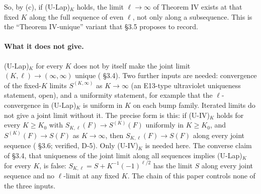 So, by (c), if (U-Lap)$_K$ holds, the limit $\ell\to\infty$ of Theorem IV exists at that fixed $K$ along the full sequence of even $\ell$, not only along a subsequence. This is the ``Theorem IV-unique'' variant that  \S3.5 proposes to record.

\paragraph{What it does not give.} (U-Lap)$_K$ for every $K$ does not by itself make the joint limit $(K,\ell)\to(\infty,\infty)$ unique ( \S3.4). Two further inputs are needed: convergence of the fixed-$K$ limits $S^{(K,\infty)}$ as $K\to\infty$ (an E13-type ultraviolet uniqueness statement, open), and a uniformity statement, for example that the $\ell$-convergence in (U-Lap)$_K$ is uniform in $K$ on each bump family. Iterated limits do not give a joint limit without it. The precise form is this: if (U-IV)$_K$ holds for every $K\ge K_0$ with $S_{K,\ell}(F)\to S^{(K)}(F)$ uniformly in $K\ge K_0$, and $S^{(K)}(F)\to S(F)$ as $K\to\infty$, then $S_{K,\ell}(F)\to S(F)$ along every joint sequence ( \S3.6; verified,  D-5). Only (U-IV)$_K$ is needed here. The converse claim of  \S3.4, that uniqueness of the joint limit along all sequences implies (U-Lap)$_K$ for every $K$, is false: $S_{K,\ell}=S+K^{-1}(-1)^{\ell/2}$ has the limit $S$ along every joint sequence and no $\ell$-limit at any fixed $K$. The chain of this paper controls none of the three inputs.

